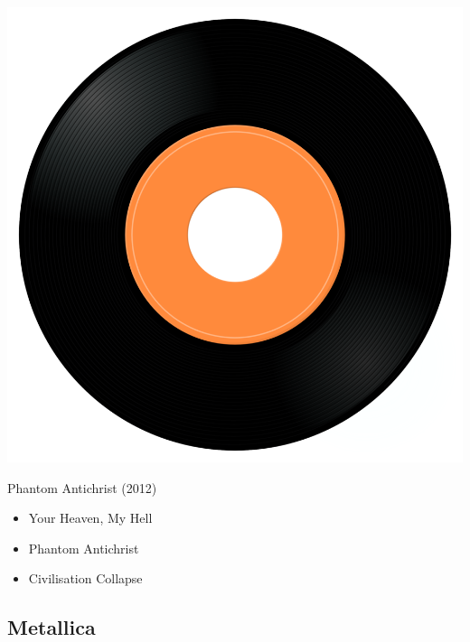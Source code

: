 \begin{minipage}[t]{0.25\textwidth}
\captionsetup{type=figure}
\includegraphics[width=\textwidth]{Images/cover.png}
\caption*{Phantom Antichrist (2012)}
\end{minipage}
\begin{minipage}[t]{0.25\textwidth}\vspace{0pt}
\begin{itemize}[nosep,leftmargin=1em,labelwidth=*,align=left]
	\setlength{\itemsep}{0pt}
	\item Your Heaven, My Hell
	\item Phantom Antichrist
	\item Civilisation Collapse
\end{itemize}
\end{minipage}

\subsection{Metallica}

